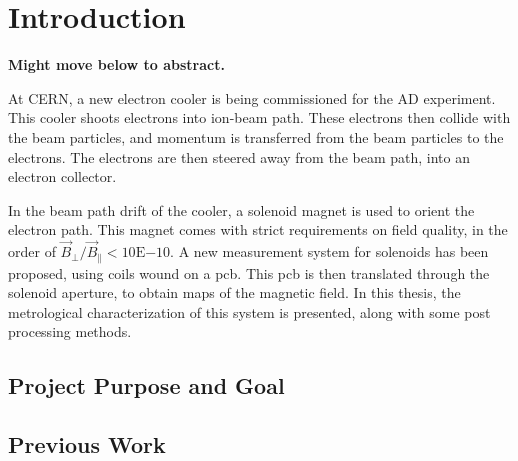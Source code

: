 \chapter{Introduction}
\textbf{Might move below to abstract.}

At CERN, a new electron cooler is being commissioned for the AD experiment.
This cooler shoots electrons into ion-beam path. These electrons then
collide with the beam particles, and momentum is transferred from the 
beam particles to the electrons. The electrons are then steered away
from the beam path, into an electron collector.

In the beam path drift of the cooler, a solenoid magnet is used to
orient the electron path. This magnet comes with strict requirements on
field quality, in the order of $\vec{B}_\perp / \vec{B}_\parallel < 10\mathrm{E}{-10}$.
A new measurement system for solenoids has been proposed, using coils wound 
on a pcb. This pcb is then translated through the solenoid aperture, to obtain
maps of the magnetic field. In this thesis, the metrological characterization of
this system is presented, along with some post processing methods.

\section{Project Purpose and Goal}

\section{Previous Work}